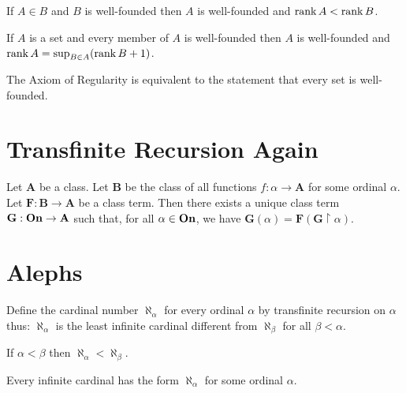 \begin{theorem}
    If $A \in B$ and $B$ is well-founded then $A$ is well-founded
    and $\operatorname{rank} A < \operatorname{rank} B$.
\end{theorem}

\begin{theorem}
    If $A$ is a set and every member of $A$ is well-founded then $A$ is well-founded
    and $\operatorname{rank} A = \sup_{B \in A} (\operatorname{rank} B + 1)$.
\end{theorem}

\begin{theorem}
    The Axiom of Regularity is equivalent to the statement that every set is well-founded.
\end{theorem}

\section{Transfinite Recursion Again}

\begin{theorem}
    Let $\mathbf{A}$ be a class. Let $\mathbf{B}$
    be the class of all functions $f : \alpha \rightarrow \mathbf{A}$
    for some ordinal $\alpha$. Let $\mathbf{F}
    : \mathbf{B} \rightarrow \mathbf{A}$ be a class term.
    Then there exists a unique class term $\mathbf{G} : \mathbf{On}
    \rightarrow \mathbf{A}$ such that, for all $\alpha \in \mathbf{On}$,
    we have $\mathbf{G}(\alpha) = \mathbf{F}(\mathbf{G} \restriction \alpha)$.
\end{theorem}

\section{Alephs}

\begin{definition}
    Define the cardinal number $\aleph_\alpha$ for every ordinal
    $\alpha$ by transfinite recursion on $\alpha$ thus:
    $\aleph_\alpha$ is the least infinite cardinal different from
    $\aleph_\beta$ for all $\beta < \alpha$.
\end{definition}

\begin{theorem}
    If $\alpha < \beta$ then $\aleph_\alpha < \aleph_\beta$.
\end{theorem}

\begin{theorem}
    Every infinite cardinal has the form $\aleph_\alpha$
    for some ordinal $\alpha$.
\end{theorem}

